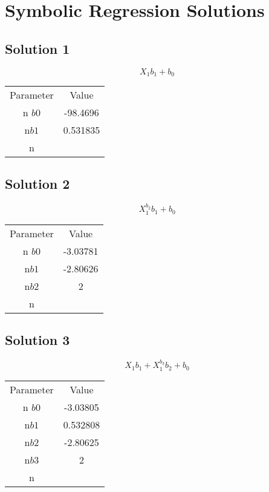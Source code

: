 \documentclass{article}Problem_g.export_solutions_to_latex(n=5, filename="gaussian_solutions.tex")
\begin{document}
\section*{Symbolic Regression Solutions}
\subsection*{Solution 1}
\[
X_{1} b_{1} + b_{0}
\]
\begin{center}
\begin{tabular}{cc}
\toprule
Parameter & Value \\n\midrule
$b0$ & -98.4696 \\n$b1$ & 0.531835 \\n\bottomrule
\end{tabular}
\end{center}

\vspace{1em}
\subsection*{Solution 2}
\[
X_{1}^{b_{2}} b_{1} + b_{0}
\]
\begin{center}
\begin{tabular}{cc}
\toprule
Parameter & Value \\n\midrule
$b0$ & -3.03781 \\n$b1$ & -2.80626 \\n$b2$ & 2 \\n\bottomrule
\end{tabular}
\end{center}

\vspace{1em}
\subsection*{Solution 3}
\[
X_{1} b_{1} + X_{1}^{b_{3}} b_{2} + b_{0}
\]
\begin{center}
\begin{tabular}{cc}
\toprule
Parameter & Value \\n\midrule
$b0$ & -3.03805 \\n$b1$ & 0.532808 \\n$b2$ & -2.80625 \\n$b3$ & 2 \\n\bottomrule
\end{tabular}
\end{center}

\vspace{1em}
\end{document}
